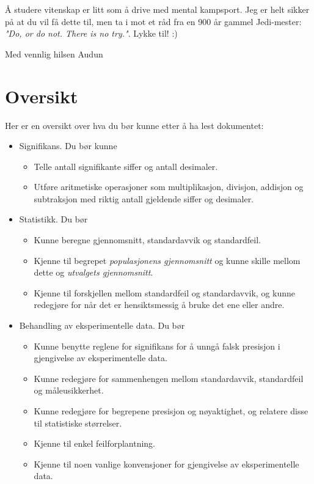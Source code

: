 \documentclass[a4paper,9pt]{article}
\begin{document}
\vspace{.5cm}

Å studere vitenskap er litt som å drive med mental kampsport. Jeg er helt sikker på at du vil få dette til, men ta i mot et råd fra en 900 år gammel Jedi-mester: \emph{"Do, or do not. There is no try."}. Lykke til! :)

\vspace{.5cm}

\begin{flushright}
Med vennlig hilsen Audun
\end{flushright}


\pagebreak

\section{Oversikt}

Her er en oversikt over hva du bør kunne etter å ha lest dokumentet:

\begin{itemize}
\item Signifikans. Du bør kunne
\begin{itemize}
\item Telle antall signifikante siffer og antall desimaler.
\item Utføre aritmetiske operasjoner som multiplikasjon, divisjon, addisjon og subtraksjon med riktig antall gjeldende siffer og desimaler.
\end{itemize}
\item Statistikk. Du bør
\begin{itemize}
\item Kunne beregne gjennomsnitt, standardavvik og standardfeil.
\item Kjenne til begrepet \emph{populasjonens gjennomsnitt} og kunne skille mellom dette og \emph{utvalgets gjennomsnitt}.
\item Kjenne til forskjellen mellom standardfeil og standardavvik, og kunne redegjøre for når det er hensiktsmessig å bruke det ene eller andre.
\end{itemize}
\item Behandling av eksperimentelle data. Du bør
\begin{itemize}
\item Kunne benytte reglene for signifikans for å unngå falsk presisjon i gjengivelse av eksperimentelle data.
\item Kunne redegjøre for sammenhengen mellom standardavvik, standardfeil og måleusikkerhet.
\item Kunne redegjøre for begrepene presisjon og nøyaktighet, og relatere disse til statistiske størrelser.
\item Kjenne til enkel feilforplantning.
\item Kjenne til noen vanlige konvensjoner for gjengivelse av eksperimentelle data.
\end{itemize}
\end{itemize}
\end{document}
